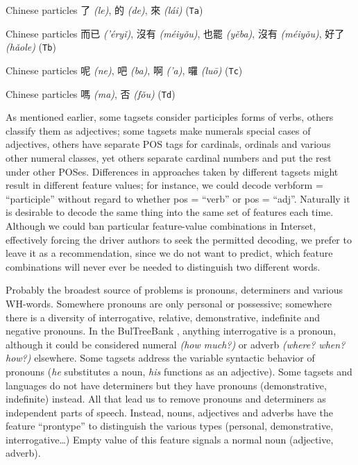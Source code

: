 \documentclass[11pt]{article}
\newcommand{\zh}[1]{{\zhfont #1}}
\newcommand{\translit}[1]{{\translitfont \textit{(#1)}}}
\newcommand{\XXX}{\textcolor{red}{XXX }} %
\begin{document}
\begin{compactitem}
\item Chinese particles \zh{了} \translit{le}, \zh{的} \translit{de}, \zh{來} \translit{lái} (\texttt{Ta})
\item Chinese particles \zh{而已} \translit{'éryǐ}, \zh{沒有} \translit{méiyǒu}, \zh{也罷} \translit{yěba}, \zh{沒有} \translit{méiyǒu}, \zh{好了} \translit{hǎole} (\texttt{Tb})
\item Chinese particles \zh{呢} \translit{ne}, \zh{吧} \translit{ba}, \zh{啊} \translit{'a}, \zh{囉} \translit{luō} (\texttt{Tc})
\item Chinese particles \zh{嗎} \translit{ma}, \zh{否} \translit{fǒu} (\texttt{Td})
\end{compactitem}

As mentioned earlier, some tagsets consider participles forms of verbs, others classify them as adjectives; some tagsets make numerals special cases of adjectives, others have separate POS tags for cardinals, ordinals and various other numeral classes, yet others separate cardinal numbers and put the rest under other POSes. Differences in approaches taken by different tagsets might result in different feature values; for instance, we could decode verbform = “participle” without regard to whether pos = “verb” or pos = “adj”. Naturally it is desirable to decode the same thing into the same set of features each time. Although we could ban particular feature-value combinations in Interset, effectively forcing the driver authors to seek the permitted decoding, we prefer to leave it as a recommendation, since we do not want to predict, which feature combinations will never ever be needed to distinguish two different words.

Probably the broadest source of problems is pronouns, determiners and various WH-words. Somewhere pronouns are only personal or possessive; somewhere there is a diversity of interrogative, relative, demonstrative, indefinite and negative pronouns. In the BulTreeBank \citep{bultreebank}, anything interrogative is a pronoun, although it could be considered numeral \textit{(how much?)} or adverb \textit{(where? when? how?)} elsewhere. Some tagsets address the variable syntactic behavior of pronouns (\textit{he} substitutes a noun, \textit{his} functions as an adjective). Some tagsets and languages do not have determiners but they have pronouns (demonstrative, indefinite) instead. All that lead us to remove pronouns and determiners as independent parts of speech. Instead, nouns, adjectives and adverbs have the feature “prontype” to distinguish the various types (personal, demonstrative, interrogative…) Empty value of this feature signals a normal noun (adjective, adverb).
\end{document}
